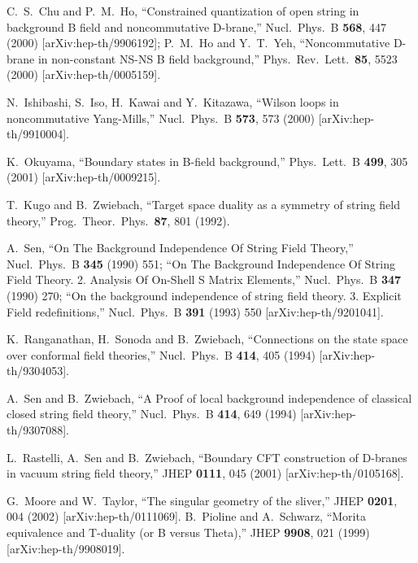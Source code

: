 \documentclass[a4paper,12pt]{article}
\begin{document}
\begin{thebibliography}{999}
C.~S.~Chu and P.~M.~Ho,
``Constrained quantization of open string 
in background B field and  noncommutative D-brane,''
Nucl.\ Phys.\ B {\bf 568}, 447 (2000)
[arXiv:hep-th/9906192];
P.~M.~Ho and Y.~T.~Yeh,
``Noncommutative D-brane in non-constant NS-NS B field background,''
Phys.\ Rev.\ Lett.\  {\bf 85}, 5523 (2000)
[arXiv:hep-th/0005159].


N.~Ishibashi, S.~Iso, H.~Kawai and Y.~Kitazawa,
``Wilson loops in noncommutative Yang-Mills,''
Nucl.\ Phys.\ B {\bf 573}, 573 (2000)
[arXiv:hep-th/9910004].

K.~Okuyama,
``Boundary states in B-field background,''
Phys.\ Lett.\ B {\bf 499}, 305 (2001)
[arXiv:hep-th/0009215].

T.~Kugo and B.~Zwiebach,
``Target space duality as a symmetry of string field theory,''
Prog.\ Theor.\ Phys.\  {\bf 87}, 801 (1992).

A.~Sen,
``On The Background Independence Of String Field Theory,''
Nucl.\ Phys.\ B {\bf 345} (1990) 551;
``On The Background Independence Of String Field Theory. 
2. Analysis Of On-Shell S Matrix Elements,''
Nucl.\ Phys.\ B {\bf 347} (1990) 270;
``On the background independence of string field theory. 
3. Explicit Field redefinitions,''
Nucl.\ Phys.\ B {\bf 391} (1993) 550
[arXiv:hep-th/9201041].

K.~Ranganathan, H.~Sonoda and B.~Zwiebach,
``Connections on the state space over conformal field theories,''
Nucl.\ Phys.\ B {\bf 414}, 405 (1994)
[arXiv:hep-th/9304053].

A.~Sen and B.~Zwiebach,
``A Proof of local background independence of 
classical closed string field theory,''
Nucl.\ Phys.\ B {\bf 414}, 649 (1994)
[arXiv:hep-th/9307088].

L.~Rastelli, A.~Sen and B.~Zwiebach,
``Boundary CFT construction of D-branes in vacuum string field theory,''
JHEP {\bf 0111}, 045 (2001)
[arXiv:hep-th/0105168].

G.~Moore and W.~Taylor,
``The singular geometry of the sliver,''
JHEP {\bf 0201}, 004 (2002)
[arXiv:hep-th/0111069].
B.~Pioline and A.~Schwarz,
``Morita equivalence and T-duality (or B versus Theta),''
JHEP {\bf 9908}, 021 (1999)
[arXiv:hep-th/9908019].




\end{thebibliography}
\end{document}
